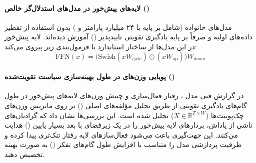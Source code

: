 \item {}

\paragraph*{لایه‌های پیش‌خور در مدل‌های استدلال‌گر خالص ()}
مدل‌های خانواده  \cite{mistral2025magistral} (شامل  بر پایه  با ۲۴ میلیارد پارامتر و ) بدون استفاده از تقطیر داده‌های اولیه و صرفاً بر پایه یادگیری تقویتی تاییدپذیر () آموزش دیده‌اند. لایه پیش‌خور در این مدل‌ها از ساختار استاندارد  با فرمول‌بندی زیر پیروی می‌کند:
\begin{equation}
    \text{FFN}(x) = \Big( \text{Swish}(x W_{\text{gate}}) \odot (x W_{\text{up}}) \Big) W_{\text{down}}
\end{equation}

\paragraph*{پویایی وزن‌های  در طول بهینه‌سازی سیاست تقویت‌شده ()}
در گزارش فنی مدل ، رفتار فعال‌سازی و چینش وزن‌های لایه‌های پیش‌خور در طول گام‌های یادگیری تقویتی از طریق تحلیل مؤلفه‌های اصلی () بر روی ماتریس وزن‌های چک‌پوینت‌ها ($X \in \mathbb{R}^{T \times W}$) تحلیل شده است. این بررسی‌ها نشان داد که گرادیان‌های ناشی از پاداش، بردارهای لایه پیش‌خور را در یک زیرفضای با بعد بسیار پایین () هدایت می‌کنند. این جهت‌گیری باعث می‌شود فعال‌سازهای لایه  رفتار تنک‌تری پیدا کرده و ظرفیت پردازشی مدل را متناسب با افزایش طول گام‌های تفکر () به صورت بهینه تخصیص دهند.

